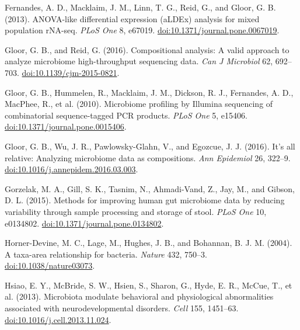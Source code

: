 \documentclass[twocolumn]{article}
\begin{document}
Fernandes, A. D., Macklaim, J. M., Linn, T. G., Reid, G., and Gloor, G.
B. (2013). ANOVA-like differential expression (aLDEx) analysis for mixed
population rNA-seq. \emph{PLoS One} 8, e67019.
\href{http://doi.org/10.1371/journal.pone.0067019}{doi:10.1371/journal.pone.0067019}.

Gloor, G. B., and Reid, G. (2016). Compositional analysis: A valid
approach to analyze microbiome high-throughput sequencing data.
\emph{Can J Microbiol} 62, 692--703.
\href{http://doi.org/10.1139/cjm-2015-0821}{doi:10.1139/cjm-2015-0821}.

Gloor, G. B., Hummelen, R., Macklaim, J. M., Dickson, R. J., Fernandes,
A. D., MacPhee, R., et al. (2010). Microbiome profiling by Illumina
sequencing of combinatorial sequence-tagged PCR products. \emph{PLoS
One} 5, e15406.
\href{http://doi.org/10.1371/journal.pone.0015406}{doi:10.1371/journal.pone.0015406}.

Gloor, G. B., Wu, J. R., Pawlowsky-Glahn, V., and Egozcue, J. J. (2016).
It's all relative: Analyzing microbiome data as compositions. \emph{Ann
Epidemiol} 26, 322--9.
\href{http://doi.org/10.1016/j.annepidem.2016.03.003}{doi:10.1016/j.annepidem.2016.03.003}.

Gorzelak, M. A., Gill, S. K., Tasnim, N., Ahmadi-Vand, Z., Jay, M., and
Gibson, D. L. (2015). Methods for improving human gut microbiome data by
reducing variability through sample processing and storage of stool.
\emph{PLoS One} 10, e0134802.
\href{http://doi.org/10.1371/journal.pone.0134802}{doi:10.1371/journal.pone.0134802}.

Horner-Devine, M. C., Lage, M., Hughes, J. B., and Bohannan, B. J. M.
(2004). A taxa-area relationship for bacteria. \emph{Nature} 432,
750--3.
\href{http://doi.org/10.1038/nature03073}{doi:10.1038/nature03073}.

Hsiao, E. Y., McBride, S. W., Hsien, S., Sharon, G., Hyde, E. R., McCue,
T., et al. (2013). Microbiota modulate behavioral and physiological
abnormalities associated with neurodevelopmental disorders. \emph{Cell}
155, 1451--63.
\href{http://doi.org/10.1016/j.cell.2013.11.024}{doi:10.1016/j.cell.2013.11.024}.
\end{document}
